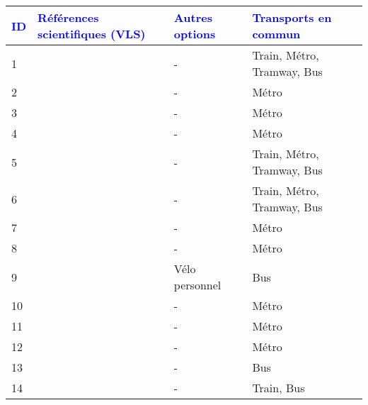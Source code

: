         \begin{longtable}{p{0.5cm}p{5.5cm}p{3cm}p{4cm}}
        \hline
        \small{\textcolor{blue}{\textbf{ID}}} & \small{\textcolor{blue}{\textbf{Références scientifiques (VLS)}}} & \small{\textcolor{blue}{\textbf{Autres options}}} & \small{\textcolor{blue}{\textbf{Transports en commun}}}\\
        \hline
        \endhead
    \small{1} & \small{\textcite{adnan_last-mile_2019}}\index{Adnan, Muhammad|pagebf} & \small{-} & \small{Train, Métro, Tramway, Bus}\\
    \small{2} & \small{\textcite{aljeri_impacts_2020}}\index{Aljeri, Moathe|pagebf} & \small{-} & \small{Métro}\\
    \small{3} & \small{\textcite{andersson_neighbourhood_2021}}\index{Andersson, David Emanuel|pagebf} & \small{-} & \small{Métro}\\
    \small{4} & \small{\textcite{ashraf_impacts_2021}}\index{Ashraf, Md Tanvir|pagebf} & \small{-} & \small{Métro}\\
    \small{5} & \small{\textcite{bachand-marleau_much-anticipated_2011}}\index{Bachand-Marleau, Julie|pagebf} & \small{-} & \small{Train, Métro, Tramway, Bus}\\
    \small{6} & \small{\textcite{basu_planning_2021}}\index{Basu, Rounaq|pagebf} & \small{-} & \small{Train, Métro, Tramway, Bus}\\
    \small{7} & \small{\textcite{bi_analysis_2021}}\index{Bi, Hui|pagebf} & \small{-} & \small{Métro}\\
    \small{8} & \small{\textcite{bocker_bike_2020}}\index{Böcker, Lars|pagebf} & \small{-} & \small{Métro}\\
    \small{9} & \small{\textcite{caggiani_equality-based_2020}}\index{Caggiani, Leonardo|pagebf} & \small{Vélo personnel} & \small{Bus}\\
    \small{10} & \small{\textcite{cheng_exploring_2022}}\index{Cheng, Long|pagebf} & \small{-} & \small{Métro}\\
    \small{11} & \small{\textcite{cheng_expanding_2018}}\index{Cheng, Yung-Hsiang|pagebf} & \small{-} & \small{Métro}\\
    \small{12} & \small{\textcite{cho_estimation_2022}}\index{Cho, Shin-Hyung|pagebf} & \small{-} & \small{Métro}\\
    \small{13} & \small{\textcite{glass_role_2020}}\index{Glass, Caroline|pagebf} & \small{-} & \small{Bus}\\
    \small{14} & \small{\textcite{griffin_planning_2016}}\index{Griffin, Greg|pagebf} & \small{-} & \small{Train, Bus}\\

\end{longtable}
